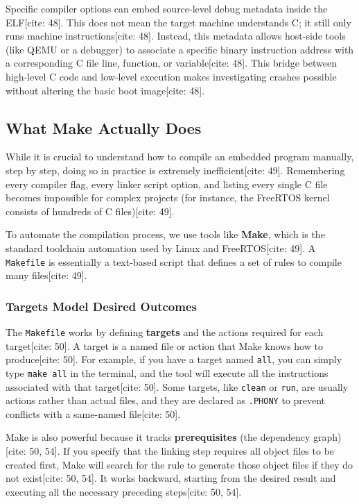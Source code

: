 Specific compiler options can embed source-level debug metadata inside the ELF[cite: 48]. This does not mean the target machine understands C; it still only runs machine instructions[cite: 48]. Instead, this metadata allows host-side tools (like QEMU or a debugger) to associate a specific binary instruction address with a corresponding C file line, function, or variable[cite: 48]. This bridge between high-level C code and low-level execution makes investigating crashes possible without altering the basic boot image[cite: 48].

\subsection{What Make Actually Does}
While it is crucial to understand how to compile an embedded program manually, step by step, doing so in practice is extremely inefficient[cite: 49]. Remembering every compiler flag, every linker script option, and listing every single C file becomes impossible for complex projects (for instance, the FreeRTOS kernel consists of hundreds of C files)[cite: 49]. 

To automate the compilation process, we use tools like \textbf{Make}, which is the standard toolchain automation used by Linux and FreeRTOS[cite: 49]. A \texttt{Makefile} is essentially a text-based script that defines a set of rules to compile many files[cite: 49]. 

\subsubsection{Targets Model Desired Outcomes}
The \texttt{Makefile} works by defining \textbf{targets} and the actions required for each target[cite: 50]. A target is a named file or action that Make knows how to produce[cite: 50]. For example, if you have a target named \texttt{all}, you can simply type \texttt{make all} in the terminal, and the tool will execute all the instructions associated with that target[cite: 50]. Some targets, like \texttt{clean} or \texttt{run}, are usually actions rather than actual files, and they are declared as \texttt{.PHONY} to prevent conflicts with a same-named file[cite: 50].

Make is also powerful because it tracks \textbf{prerequisites} (the dependency graph)[cite: 50, 54]. If you specify that the linking step requires all object files to be created first, Make will search for the rule to generate those object files if they do not exist[cite: 50, 54]. It works backward, starting from the desired result and executing all the necessary preceding steps[cite: 50, 54].

